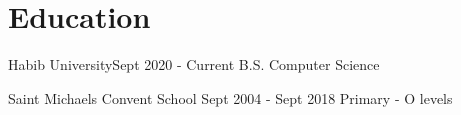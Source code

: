 \section{Education}
  \resumeSubHeadingListStart
  
    \resumeSubheading
      {Habib University}{Sept 2020 - Current}
      {B.S. Computer Science}{}
      
    \resumeSubheading
      {Saint Michaels Convent School \footnotesize{}}{Sept 2004 - Sept 2018 }
      {Primary - O levels}{}    

      \resumeSubHeadingListEnd
